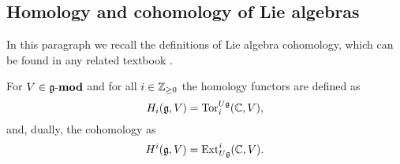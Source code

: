 \subsection{Homology and cohomology of Lie algebras}
In this paragraph we recall the definitions of Lie algebra cohomology, which can be found in any
related textbook .

\begin{definition}
    For $V\in \operatorname{\mathbf{\mathfrak{g}-mod}}$ and for all $i\in \mathbb{Z}_{\geq0}$ the homology functors are defined as 
    \begin{equation}
        H_i(\mathfrak{g}, V) = \mathrm{Tor}_i^{U\mathfrak{g}}(\mathbb{C}, V),
    \end{equation}
    and, dually, the cohomology as
    \begin{equation}
        H^i(\mathfrak{g}, V) = \operatorname{Ext}^i_{U\mathfrak{g}}(\mathbb{C}, V).
    \end{equation}

\end{definition}
